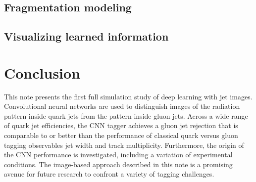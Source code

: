 \documentclass[UKenglish,texlive=2016]{\ATLASLATEXPATH atlasdoc}
\begin{document}


\subsection{Fragmentation modeling}
\label{sec:frag}



\subsection{Visualizing learned information}
\label{sec:learningaboutlearning}




%


 \FloatBarrier


\section{Conclusion}
\label{sec:conclusion}

This note presents the first full simulation study of deep learning with jet images.  Convolutional neural networks are used to distinguish images of the radiation pattern inside quark jets from the pattern inside gluon jets.  Across a wide range of quark jet efficiencies, the CNN tagger achieves a gluon jet rejection that is comparable to or better than the performance of classical quark versus gluon  tagging observables jet width and track multiplicity.  Furthermore, the origin of the CNN performance is investigated, including a variation of experimental conditions.  The image-based approach described in this note is a promising avenue for future research to confront a variety of tagging challenges.
\end{document}
